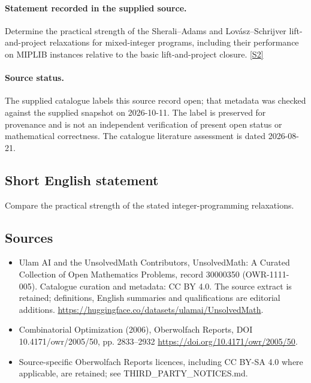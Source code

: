 \documentclass[11pt]{article}
\begin{document}
\paragraph{Statement recorded in the supplied source.}
Determine the practical strength of the Sherali–Adams and Lovász–Schrijver lift-and-project relaxations for mixed-integer programs, including their performance on MIPLIB instances relative to the basic lift-and-project closure. \href{https://doi.org/10.4171/owr/2005/50}{[S2]}
\paragraph{Source status.}
The supplied catalogue labels this source record open; that metadata was checked against the supplied snapshot on 2026-10-11. The label is preserved for provenance and is not an independent verification of present open status or mathematical correctness. The catalogue literature assessment is dated 2026-08-21.
\subsection{Short English statement}
Compare the practical strength of the stated integer-programming relaxations.
\subsection{Sources}
\begin{itemize}
\item[S1] Ulam AI and the UnsolvedMath Contributors, UnsolvedMath: A Curated Collection of Open Mathematics Problems, record 30000350 (OWR-1111-005). Catalogue curation and metadata: CC BY 4.0. The source extract is retained; definitions, English summaries and qualifications are editorial additions.
\url{https://huggingface.co/datasets/ulamai/UnsolvedMath}.
\item[S2] Combinatorial Optimization (2006), Oberwolfach Reports, DOI 10.4171/owr/2005/50, pp. 2833--2932
\url{https://doi.org/10.4171/owr/2005/50}.
\item Source-specific Oberwolfach Reports licences, including CC BY-SA 4.0 where applicable, are retained; see THIRD\_PARTY\_NOTICES.md.
\end{itemize}
\end{document}
